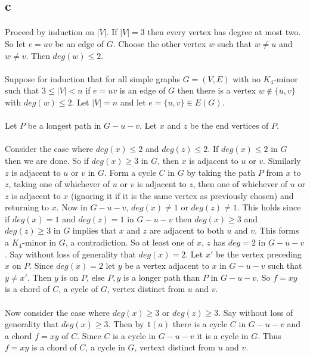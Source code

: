 \documentclass[letterpaper,12pt,oneside,onecolumn]{report}
\begin{document}
\subsection*{c}
\paragraph{}
Proceed by induction on $|V|$. If $|V|=3$ then every vertex has degree at most two. So let $e=uv$ be an edge of $G$. Choose the other vertex $w$ such that $w \neq u$ and $w \neq v$. Then $deg(w) \leq 2$.
\paragraph{}
Suppose for induction that for all simple graphs $G=(V,E)$ with no $K_4$-minor such that $3 \leq |V| < n$ if $e=uv$ is an edge of $G$ then there is a vertex $w \not\in \{u,v\}$ with $deg(w) \leq 2$. 
Let $|V| = n$ and let $e = \{u,v\} \in E(G)$.
\paragraph{} 
Let $P$ be a longest path in $G - u - v$. Let $x$ and $z$ be the end vertices of $P$.
\paragraph{}
Consider the case where $deg(x) \leq 2$ and $deg(z) \leq 2$. If $deg(x) \leq 2$ in $G$ then we are done. So if $deg(x) \geq 3$ in $G$, then $x$ is adjacent to $u$ or $v$. Similarly $z$ is adjacent to $u$ or $v$ in $G$. Form a cycle $C$ in $G$ by taking the path $P$ from $x$ to $z$, taking one of whichever of $u$ or $v$ is adjacent to $z$, then one of whichever of $u$ or $z$ is adjacent to $x$ (ignoring it if it is the same vertex as previously chosen) and returning to $x$. Now in $G-u-v$, $deg(x) \neq 1$ or $deg(z) \neq 1$. This holds since if $deg(x) = 1$ and $deg(z) = 1$ in $G - u - v$ then $deg(x) \geq 3$ and $deg(z) \geq 3$ in $G$ implies that $x$ and $z$ are adjacent to both $u$ and $v$. This forms a $K_4$-minor in $G$, a contradiction. So at least one of $x$, $z$ has $deg = 2$ in $G - u - v$. Say without loss of generality that $deg(x) = 2$. Let $x'$ be the vertex preceding $x$ on $P$.  Since $deg(x) = 2$ let $y$ be a vertex adjacent to $x$ in $G - u - v$ such that $y \neq x'$. Then $y$ is on $P$, else $P,y$ is a longer path than $P$ in $G - u -v$. So $f = xy$ is a chord of $C$, a cycle of $G$, vertex distinct from $u$ and $v$.
\paragraph{}
Now consider the case where $deg(x) \geq 3$ or $deg(z) \geq 3$. Say without loss of generality that $deg(x) \geq 3$. Then by $1(a)$ there is a cycle $C$ in $G-u-v$ and a chord $f=xy$ of $C$. Since $C$ is a cycle in $G-u-v$ it is a cycle in $G$. Thus $f = xy$ is a chord of $C$, a cycle in $G$, vertext distinct from $u$ and $v$.
\end{document}

